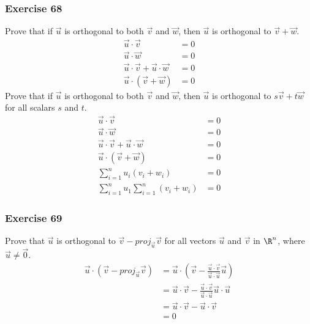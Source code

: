 \documentclass{math}
\begin{document}
\subsubsection*{Exercise 68}
Prove that if \( \vec{u} \) is orthogonal to both \( \vec{v} \) and \( \vec{w}
\), then \( \vec{u} \) is orthogonal to \( \vec{v}+\vec{w} \).
\begin{align*}
  \vec{u}\cdot\vec{v} &= 0 \\
  \vec{u}\cdot\vec{w} &= 0 \\
  \vec{u}\cdot\vec{v}+\vec{u}\cdot\vec{w} &= 0 \\
  \vec{u}\cdot(\vec{v}+\vec{w}) &= 0
\end{align*}
Prove that if \( \vec{u} \) is orthogonal to both \( \vec{v} \) and \( \vec{w}
\), then \( \vec{u} \) is orthogonal to \( s\vec{v}+t\vec{w} \) for all
scalars \( s \) and \( t \).
\begin{align*}
  \vec{u}\cdot\vec{v} &= 0 \\
  \vec{u}\cdot\vec{w} &= 0 \\
  \vec{u}\cdot\vec{v}+\vec{u}\cdot\vec{w} &= 0 \\
  \vec{u}\cdot(\vec{v}+\vec{w}) &= 0 \\
  \sum_{i=1}^{n}u_i(v_i+w_i) &= 0 \\
  \sum_{i=1}^{n}u_1\sum_{i=1}^{n}(v_i+w_i) &= 0
\end{align*}

\subsubsection*{Exercise 69}
Prove that \( \vec{u} \) is orthogonal to \( \vec{v}-proj_{\vec{u}}\vec{v} \)
for all vectors \( \vec{u} \) and \( \vec{v} \) in \( \R^n \), where
\( \vec{u}\ne\vec{0} \).
\begin{align*}
  \vec{u}\cdot(\vec{v}-proj_{\vec{u}}\vec{v}) &= \vec{u}\cdot(\vec{v}-
    \frac{\vec{u}\cdot\vec{v}}{\vec{u}\cdot\vec{u}}\vec{u}) \\
  &= \vec{u}\cdot\vec{v}-
    \frac{\vec{u}\cdot\vec{v}}{\vec{u}\cdot\vec{u}}\vec{u}\cdot\vec{u} \\
  &= \vec{u}\cdot\vec{v}-\vec{u}\cdot\vec{v} \\
  &= 0
\end{align*}
\end{document}
